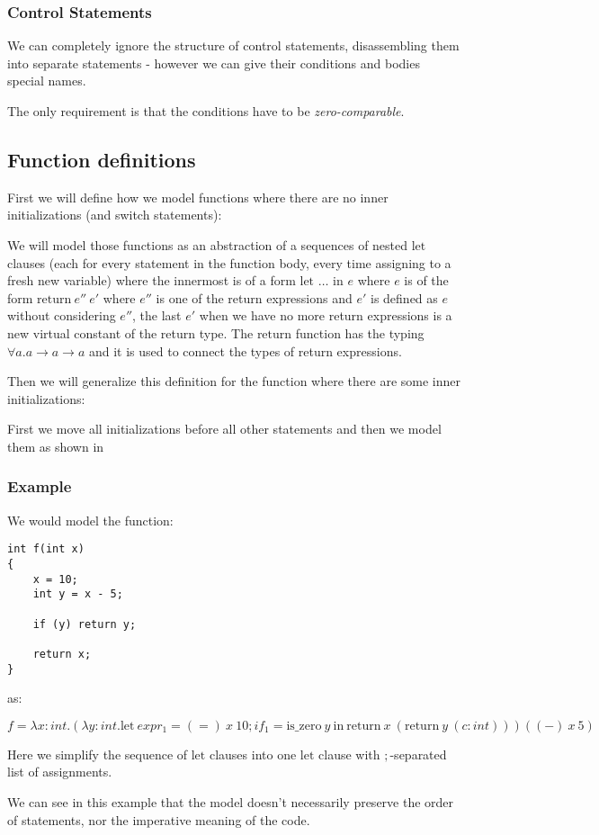 \subsubsection{Control Statements}

We can completely ignore the structure of control statements, disassembling them into separate statements - however we can give their conditions and bodies special names.

The only requirement is that the conditions have to be \emph{zero-comparable}. %

\subsection{Function definitions}

First we will define how we model functions where there are no inner initializations (and switch statements):

We will model those functions as an abstraction of a sequences of nested $\text{let}$ clauses (each for every statement in the function body, every time assigning to a fresh new variable) where the innermost is of a form $\text{let } \dots \text{ in } e$ where $e$ is of the form $\text{return}\ e''\ e'$ where $e''$ is one of the return expressions and $e'$ is defined as $e$ without considering $e''$, the last $e'$ when we have no more return expressions is a new virtual constant of the return type. The $\text{return}$ function has the typing $\forall a . a \rightarrow a \rightarrow a$ and it is used to connect the types of return expressions.

Then we will generalize this definition for the function where there are some inner initializations:

First we move all initializations before all other statements and then we model them as shown in %

\subsubsection{Example}

We would model the function:

\begin{lstlisting}
int f(int x)
{
	x = 10;
	int y = x - 5;

	if (y) return y;

	return x;
}
\end{lstlisting}

as:

$f = \lambda x : int . (\lambda y : int . \text{let}\ expr_1 = (=)\ x\ 10; if_1 = \text{is_zero}\ y\ \text{in}\ \text{return}\ x\ (\text{return}\ y\ (c : int))) ((-)\ x\ 5)$

Here we simplify the sequence of $\text{let}$ clauses into one $\text{let}$ clause with $;$-separated list of assignments.

We can see in this example that the model doesn't necessarily preserve the order of statements, nor the imperative meaning of the code.
